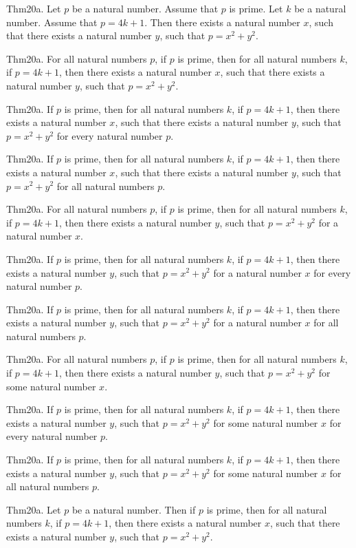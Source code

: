 \documentclass{article}
\begin{document}
Thm20a. Let $p$ be a natural number. Assume that $p$ is prime. Let $k$ be a natural number. Assume that $p = 4 k + 1$. Then there exists a natural number $x$, such that there exists a natural number $y$, such that $p = x ^{ 2}+ y ^{ 2}$.

Thm20a. For all natural numbers $p$, if $p$ is prime, then for all natural numbers $k$, if $p = 4 k + 1$, then there exists a natural number $x$, such that there exists a natural number $y$, such that $p = x ^{ 2}+ y ^{ 2}$.

Thm20a. If $p$ is prime, then for all natural numbers $k$, if $p = 4 k + 1$, then there exists a natural number $x$, such that there exists a natural number $y$, such that $p = x ^{ 2}+ y ^{ 2}$ for every natural number $p$.

Thm20a. If $p$ is prime, then for all natural numbers $k$, if $p = 4 k + 1$, then there exists a natural number $x$, such that there exists a natural number $y$, such that $p = x ^{ 2}+ y ^{ 2}$ for all natural numbers $p$.

Thm20a. For all natural numbers $p$, if $p$ is prime, then for all natural numbers $k$, if $p = 4 k + 1$, then there exists a natural number $y$, such that $p = x ^{ 2}+ y ^{ 2}$ for a natural number $x$.

Thm20a. If $p$ is prime, then for all natural numbers $k$, if $p = 4 k + 1$, then there exists a natural number $y$, such that $p = x ^{ 2}+ y ^{ 2}$ for a natural number $x$ for every natural number $p$.

Thm20a. If $p$ is prime, then for all natural numbers $k$, if $p = 4 k + 1$, then there exists a natural number $y$, such that $p = x ^{ 2}+ y ^{ 2}$ for a natural number $x$ for all natural numbers $p$.

Thm20a. For all natural numbers $p$, if $p$ is prime, then for all natural numbers $k$, if $p = 4 k + 1$, then there exists a natural number $y$, such that $p = x ^{ 2}+ y ^{ 2}$ for some natural number $x$.

Thm20a. If $p$ is prime, then for all natural numbers $k$, if $p = 4 k + 1$, then there exists a natural number $y$, such that $p = x ^{ 2}+ y ^{ 2}$ for some natural number $x$ for every natural number $p$.

Thm20a. If $p$ is prime, then for all natural numbers $k$, if $p = 4 k + 1$, then there exists a natural number $y$, such that $p = x ^{ 2}+ y ^{ 2}$ for some natural number $x$ for all natural numbers $p$.

Thm20a. Let $p$ be a natural number. Then if $p$ is prime, then for all natural numbers $k$, if $p = 4 k + 1$, then there exists a natural number $x$, such that there exists a natural number $y$, such that $p = x ^{ 2}+ y ^{ 2}$.
\end{document}
